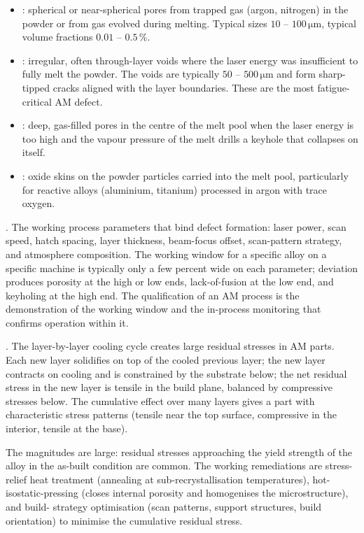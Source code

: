 \begin{itemize}[leftmargin=*]
\item {}: spherical or near-spherical pores from
  trapped gas (argon, nitrogen) in the powder or from gas evolved
  during melting. Typical sizes $10$ -- $100\,\si{\micro\meter}$,
  typical volume fractions $0.01$ -- $0.5\,\%$.
\item {}: irregular, often
  through-layer voids where the laser energy was insufficient to
  fully melt the powder. The voids are typically $50$ -- $500\,
  \si{\micro\meter}$ and form sharp-tipped cracks aligned with the
  layer boundaries. These are the most fatigue-critical AM defect.
\item {}: deep, gas-filled pores in the
  centre of the melt pool when the laser energy is too high and the
  vapour pressure of the melt drills a keyhole that collapses on
  itself.
\item {}: oxide skins on the powder particles
  carried into the melt pool, particularly for reactive alloys
  (aluminium, titanium) processed in argon with trace oxygen.
\end{itemize}

. The working process
parameters that bind defect formation: laser power, scan speed,
hatch spacing, layer thickness, beam-focus offset, scan-pattern
strategy, and atmosphere composition. The working window for a
specific alloy on a specific machine is typically only a few
percent wide on each parameter; deviation produces porosity at the
high or low ends, lack-of-fusion at the low end, and keyholing at
the high end. The qualification of an AM process is the
demonstration of the working window and the in-process monitoring
that confirms operation within it.

. The layer-by-layer cooling cycle
creates large residual stresses in AM parts. Each new layer
solidifies on top of the cooled previous layer; the new layer
contracts on cooling and is constrained by the substrate below;
the net residual stress in the new layer is tensile in the build
plane, balanced by compressive stresses below. The cumulative effect
over many layers gives a part with characteristic stress patterns
(tensile near the top surface, compressive in the interior, tensile
at the base).

The magnitudes are large: residual stresses approaching the yield
strength of the alloy in the as-built condition are common. The
working remediations are stress-relief heat treatment (annealing at
sub-recrystallisation temperatures), hot-isostatic-pressing (closes
internal porosity and homogenises the microstructure), and build-
strategy optimisation (scan patterns, support structures, build
orientation) to minimise the cumulative residual stress.

